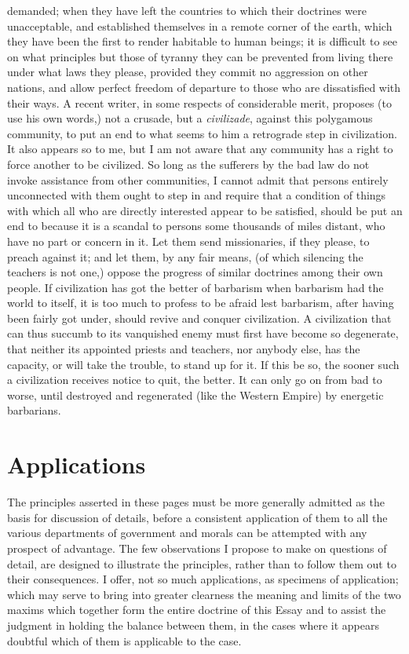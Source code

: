 \documentclass[12pt]{report}
\begin{document}
demanded; when they have left the countries to which their doctrines were unacceptable, and established themselves in a remote corner of the earth, which they have been the first to render habitable to human beings; it is difficult to see on what principles but those of tyranny they can be prevented from living there under what laws they please, provided they commit no aggression on other nations, and allow perfect freedom of departure to those who are dissatisfied with their ways. A recent writer, in some respects of considerable merit, proposes (to use his own words,) not a crusade, but a \emph{civilizade}, against this polygamous community, to put an end to what seems to him a retrograde step in civilization. It also appears so to me, but I am not aware that any community has a right to force another to be civilized. So long as the sufferers by the bad law do not invoke assistance from other communities, I cannot admit that persons entirely unconnected with them ought to step in and require that a condition of things with which all who are directly interested appear to be satisfied, should be put an end to because it is a scandal to persons some thousands of miles distant, who have no part or concern in it. Let them send missionaries, if they please, to preach against it; and let them, by any fair means, (of which silencing the teachers is not one,) oppose the progress of similar doctrines among their own people. If civilization has got the better of barbarism when barbarism had the world to itself, it is too much to profess to be afraid lest barbarism, after having been fairly got under, should revive and conquer civilization. A civilization that can thus succumb to its vanquished enemy must first have become so degenerate, that neither its appointed priests and teachers, nor anybody else, has the capacity, or will take the trouble, to stand up for it. If this be so, the sooner such a civilization receives notice to quit, the better. It can only go on from bad to worse, until destroyed and regenerated (like the Western Empire) by energetic barbarians.

\chapter{Applications}
The principles asserted in these pages must be more generally admitted as the basis for discussion of details, before a consistent application of them to all the various departments of government and morals can be attempted with any prospect of advantage. The few observations I propose to make on questions of detail, are designed to illustrate the principles, rather than to follow them out to their consequences. I offer, not so much applications, as specimens of application; which may serve to bring into greater clearness the meaning and limits of the two maxims which together form the entire doctrine of this Essay and to assist the judgment in holding the balance between them, in the cases where it appears doubtful which of them is applicable to the case.
\end{document}
